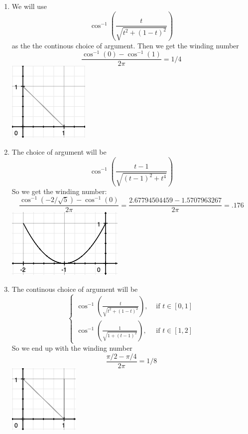 \documentclass{article}
\begin{document}
\begin{enumerate}
\begin{enumerate}[label=(\roman*)]
        \item
          We will use
          \[\cos^{-1}\left(\frac{t}{\sqrt{t^{2}+\left(1-t\right)^{2}}}\right)\]
          as the the continous choice of argument. Then we get the winding number
          \[\frac{\cos^{-1}(0)-\cos^{-1}(1)}{2\pi}=1/4\]
          \includegraphics[scale=0.5]{g2.png}
        \item
          The choice of argument will be
          \[\cos^{-1}\left(\frac{t-1}{\sqrt{\left(t-1\right)^{2}+t^{4}}}\right)\]
          So we get the winding number:
          \[\frac{\cos^{-1}\left(-2/\sqrt{5}\right)-\cos^{-1}(0)}{2\pi}=\frac{2.67794504459-1.5707963267}{2\pi}=.176\]
          \includegraphics[scale=0.5]{g3.png}
        \item
          The continous choice of argument will be
          \[\begin{cases}
            \cos^{-1}\left(\frac{t}{\sqrt{t^{2}+(1-t)^{2}}}\right),&\text{ if }t\in[0,1]\\
            \cos^{-1}\left(\frac{1}{\sqrt{1+(t-1)^{2}}}\right),&\text{ if }t\in[1,2]
          \end{cases}\]
          So we end up with the winding number
          \[\frac{\pi/2-\pi/4}{2\pi}=1/8\]
          \includegraphics[scale=0.5]{g4.png}
      \end{enumerate}
  \end{enumerate}
\end{document}
